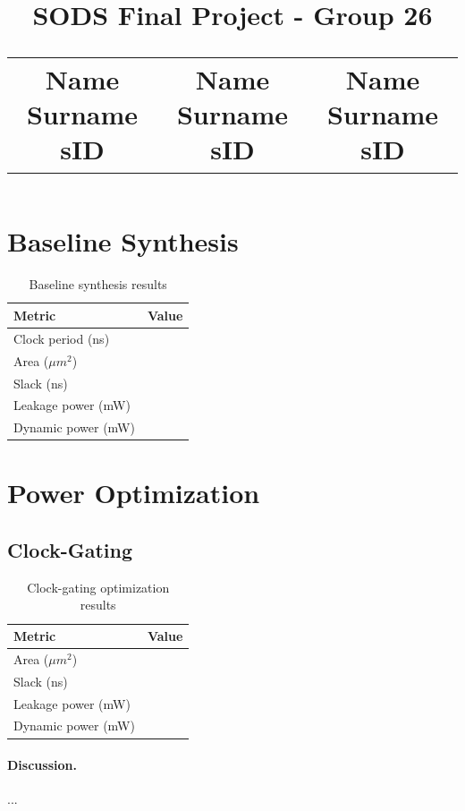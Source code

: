 \documentclass[11pt,a4paper]{article}
\title{
    \textbf{SODS Final Project - Group 26}\\[0.5em]
    \large
    \begin{tabular}{ccc}
        Name Surname sID & Name Surname sID & Name Surname sID
    \end{tabular}
}
\begin{document}
\date{}

\maketitle
\vspace{-2cm}
\section{Baseline Synthesis}

\begin{table}[h]
\centering
\caption{Baseline synthesis results}
\begin{tabular}{lc}
\toprule
\textbf{Metric} & \textbf{Value} \\
\midrule
Clock period (ns) &  \\
Area ($\mu m^2$) &  \\
Slack (ns) &  \\
Leakage power (mW) &  \\
Dynamic power (mW) &  \\
\bottomrule
\end{tabular}
\end{table}

\section{Power Optimization}

\subsection{Clock-Gating}

\begin{table}[h]
\centering
\caption{Clock-gating optimization results}
\begin{tabular}{lc}
\toprule
\textbf{Metric} & \textbf{Value} \\
\midrule
Area ($\mu m^2$) &  \\
Slack (ns) &  \\
Leakage power (mW) &  \\
Dynamic power (mW) &  \\
\bottomrule
\end{tabular}
\end{table}

\paragraph{Discussion.} ...
\end{document}
